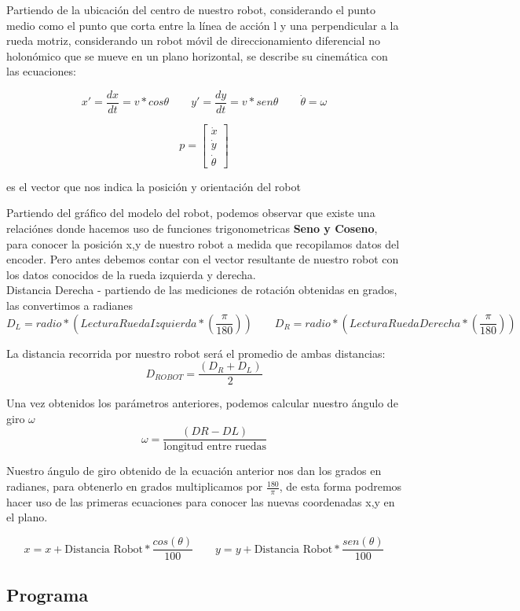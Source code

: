 \documentclass[oneside,twocolumn]{article}
\begin{document}
Partiendo de la ubicación del centro de nuestro robot, considerando el punto medio como el punto que corta entre la línea de acción l y una perpendicular a la rueda motriz, considerando un robot móvil de direccionamiento diferencial no holonómico que se mueve en un plano horizontal, se describe su cinemática con las ecuaciones:

\[ x' = \frac{dx}{dt} = v*cos \theta \qquad y' = \frac{dy}{dt} = v*sen \theta \qquad \dot{\theta} = \omega \]

\[ p = \begin{bmatrix}
  \dot{x}\\
  \dot{y}\\
  \dot{\theta}
\end{bmatrix}\]

es el vector que nos indica la posición y orientación del robot

Partiendo del gráfico del modelo del robot, podemos observar que existe una relaciónes donde hacemos uso de funciones trigonometricas \textbf{Seno y Coseno}, para conocer la posición x,y de nuestro robot a medida que recopilamos datos del encoder. Pero antes debemos contar con el vector resultante de nuestro robot con los datos conocidos de la rueda izquierda y derecha.\\

Distancia Derecha - partiendo de las mediciones de rotación obtenidas en grados, las convertimos a radianes\\
\[ D_{L} = radio * (Lectura Rueda Izquierda * (\frac{\pi}{180})) \qquad D_{R} = radio * (Lectura Rueda Derecha * (\frac{\pi}{180})) \]

La distancia recorrida por nuestro robot será el promedio de ambas distancias:
\[D_{ROBOT} = \frac{(D_{R}+D_{L})}{2}\]

Una vez obtenidos los parámetros anteriores, podemos calcular nuestro ángulo de giro $\omega$
\[\omega = \frac{(DR-DL)}{\mbox{longitud entre ruedas}} \]

Nuestro ángulo de giro obtenido de la ecuación anterior nos dan los grados en radianes, para obtenerlo en grados multiplicamos por $\frac{180}{\pi}$, de esta forma podremos hacer uso de las primeras ecuaciones para conocer las nuevas coordenadas x,y en el plano.

\[ x = x + \mbox{Distancia Robot} * \frac{cos(\theta)}{100} \qquad y = y + \mbox{Distancia Robot} * \frac{sen(\theta)}{100} \]

\subsection{Programa}
\end{document}
